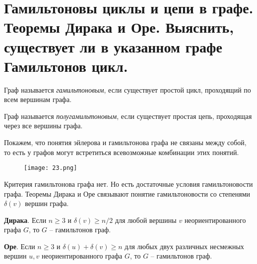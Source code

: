 \section{Гамильтоновы циклы и цепи в графе. Теоремы Дирака и Оре. Выяснить, существует ли в 
указанном графе Гамильтонов цикл.}

\begin{definition}
    Граф называется \textit{гамильтоновым}, если существует простой
    цикл, проходящий по всем вершинам графа.
\end{definition}

\begin{definition}
    Граф называется \textit{полугамильтоновым}, если существует простая
    цепь, проходящая через все вершины графа.
\end{definition}

Покажем, что понятия эйлерова и гамильтонова графа не связаны между
собой, то есть у графов могут встретиться всевозможные комбинации этих
понятий.

\begin{figure}[h]
    \centering
    \texttt{[image: 23.png]}
\end{figure}

Критерия гамильтонова графа нет. Но есть достаточные условия
гамильтоновости графа. Теоремы Дирака и Оре связывают понятие
гамильтоновости со степенями $\delta(v)$ вершин графа.

\begin{theorem}
    \textbf{Дирака}. Если $n \geq 3$ и $\delta(v) \geq n/2$ для любой вершины $v$
    неориентированного графа $G$, то $G$ -- гамильтонов граф.
\end{theorem}

\begin{theorem}
    \textbf{Оре}. Если $n \geq 3$ и $\delta(u) + \delta(v) \geq n$ для любых двух различных
    несмежных вершин $u, v$ неориентированного графа $G$, то $G$ -- гамильтонов граф.
\end{theorem}